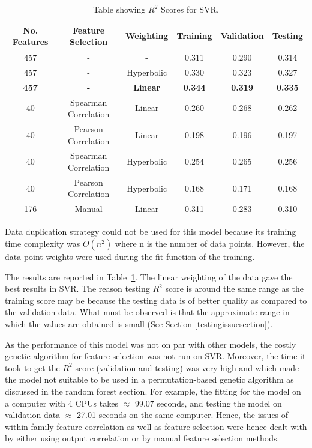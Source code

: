 \documentclass[11pt]{article}
\begin{document}
\begin{table} [h!]
\centering
\resizebox{\linewidth}{!} {
 \begin{tabular}{ | c | c | c | c | c | c | }
\hline
\textbf{No. Features} & \textbf{Feature Selection} & \textbf{Weighting} & \textbf{Training} & \textbf{Validation} &  \textbf{Testing} \\ [0.5 ex]
\hline \hline
457 & - & - & 0.311 & 0.290 & 0.314\\
457 & - & Hyperbolic & 0.330 & 0.323 & 0.327\\
\textbf{457} & \textbf{-} & \textbf{Linear}  & \textbf{0.344} &\textbf{0.319} & \textbf{0.335}\\
40 & Spearman Correlation & Linear & 0.260 & 0.268  & 0.262 \\ 
40 & Pearson Correlation & Linear & 0.198 & 0.196 & 0.197 \\ 
40 & Spearman Correlation & Hyperbolic & 0.254 & 0.265 & 0.256 \\ 
40 & Pearson Correlation & Hyperbolic & 0.168 & 0.171 & 0.168 \\ 
176 & Manual & Linear &  0.311  & 0.283  & 0.310\\ [1ex]
\hline
\end{tabular}
}
\caption{Table showing  $R^2$ Scores for SVR.}
\label {table:2}
\end{table}

Data duplication strategy could not be used for this model because its training time complexity was $O(n^2)$ where n is the number of data points. However, the data point weights were used during the fit function of the training.

The results are reported in Table~\ref{table:2}.
The linear weighting of the data gave the best results in SVR.
The reason testing $R^2$ score is around the same range as the training score may be because the testing data is of better quality as compared to the validation data.
What must be observed is that the approximate range in which the values are obtained is small (See Section \ref{testingissuesection}).

As the performance of this model was not on par with other models,
the costly genetic algorithm for feature selection was not run on SVR.
Moreover,  the time it took to get the $R^2$ score (validation and testing) was very high and which made the model not suitable to be used in a permutation-based genetic algorithm as discussed in the random forest section.
For example, the fitting for the model on a computer with 4 CPUs takes $\approx$ 99.07 seconds, and testing the model on validation data $\approx$ 27.01 seconds on the same computer. 
Hence,  the issues of within family feature correlation as well as feature selection were hence dealt with by either using output correlation or by manual feature selection methods.
\end{document}
